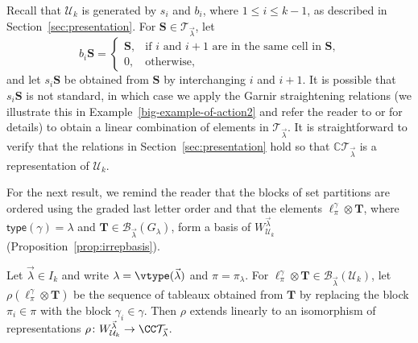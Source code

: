 Recall that $\mathcal{U}_k$ is generated by $s_i$ and $b_i$,
where $1\leqslant i \leqslant k-1$, as described in Section~\ref{sec:presentation}. For $\mathbf{S}\in \mathcal{T}_{\vec{\lambda}}$,
let
\begin{equation}
    \label{bi-action-on-S}
    b_i \mathbf{S} = \begin{cases} \mathbf{S}, & \text{if $i$ and $i+1$ are in the same cell in $\mathbf{S}$,}\\
    0, & \text{otherwise,}\end{cases}
\end{equation}
and let $s_i\mathbf{S}$ be obtained from $\mathbf{S}$ by interchanging $i$ and $i+1$. It is possible that
$s_i \mathbf{S}$ is not standard, in which case we apply the Garnir straightening relations
(we illustrate this in Example~\ref{big-example-of-action2} and refer the reader
to \cite[Section 2.6]{Sagan.2001} or \cite{CarreLascouxLeclerc} for details)
to obtain a linear combination of elements in $\mathcal{T}_{\vec{\lambda}}$.
It is straightforward to verify that the relations in Section~\ref{sec:presentation} hold
so that $\mathbb{C}\mathcal{T}_{\vec{\lambda}}$ is a representation of $\mathcal{U}_k$.

For the next result, we remind the reader that the blocks of set partitions are
ordered using the graded last letter order and that
the elements $\ell_\pi^\gamma \otimes \mathbf{T}$, where $\mathsf{type}(\gamma)
= \lambda$ and $\mathbf{T} \in \mathcal{B}_{\vec{\lambda}}(G_\lambda)$,
form a basis of $W^{\vec{\lambda}}_{\mathcal{U}_k}$ (Proposition~\ref{prop:irrepbasis}).
\begin{theorem}\label{th:tableauxmodule}
Let $\vec{\lambda}\in I_k$ and write $\lambda = \vtype(\vec{\lambda})$ and $\pi = \pi_\lambda$.
For $\ell_{\pi}^\gamma \otimes \mathbf{T} \in \mathcal{B}_{\vec{\lambda}}(\mathcal{U}_k)$, let
$\rho(\ell_{\pi}^\gamma \otimes \mathbf{T})$ be the sequence of tableaux obtained
from $\mathbf{T}$ by replacing the block $\pi_i\in \pi$ with the block $\gamma_i\in \gamma$.
Then $\rho$ extends linearly to an isomorphism of representations
$\rho \colon W^{\vec{\lambda}}_{\mathcal{U}_k}\rightarrow \CC\mathcal{T}_{\vec{\lambda}}$.
\end{theorem}

